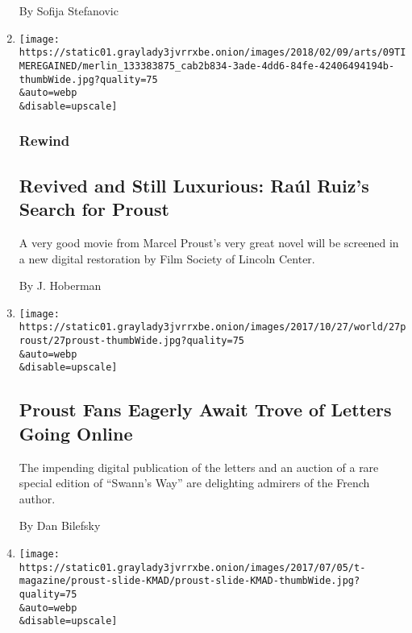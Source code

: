 \begin{enumerate}
  By Sofija Stefanovic
\item
  \href{/2018/02/08/movies/raul-ruizs-time-regained-film-society-of-lincoln-center.html}{}

  \texttt{[image: https://static01.graylady3jvrrxbe.onion/images/2018/02/09/arts/09TIMEREGAINED/merlin\_133383875\_cab2b834-3ade-4dd6-84fe-42406494194b-thumbWide.jpg?quality=75\\\&auto=webp\\\&disable=upscale]}

  \hypertarget{rewind}{%
  \subsubsection{Rewind}\label{rewind}}

  \hypertarget{revived-and-still-luxurious-rauxfal-ruizs-search-for-proust}{%
  \subsection{Revived and Still Luxurious: Raúl Ruiz's Search for
  Proust}\label{revived-and-still-luxurious-rauxfal-ruizs-search-for-proust}}

  A very good movie from Marcel Proust's very great novel will be
  screened in a new digital restoration by Film Society of Lincoln
  Center.

  By J. Hoberman
\item
  \href{/2017/10/26/world/europe/proust-letters-auction.html}{}

  \texttt{[image: https://static01.graylady3jvrrxbe.onion/images/2017/10/27/world/27proust/27proust-thumbWide.jpg?quality=75\\\&auto=webp\\\&disable=upscale]}

  \hypertarget{proust-fans-eagerly-await-trove-of-letters-going-online}{%
  \subsection{Proust Fans Eagerly Await Trove of Letters Going
  Online}\label{proust-fans-eagerly-await-trove-of-letters-going-online}}

  The impending digital publication of the letters and an auction of a
  rare special edition of ``Swann's Way'' are delighting admirers of the
  French author.

  By Dan Bilefsky
\item
  \href{/2017/05/15/t-magazine/william-friedkin-marcel-proust.html}{}

  \texttt{[image: https://static01.graylady3jvrrxbe.onion/images/2017/07/05/t-magazine/proust-slide-KMAD/proust-slide-KMAD-thumbWide.jpg?quality=75\\\&auto=webp\\\&disable=upscale]}


\end{enumerate}
